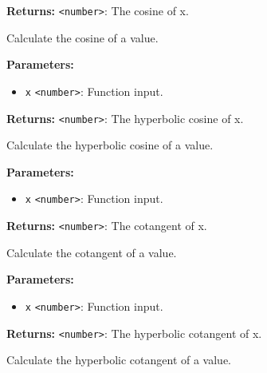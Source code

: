 \documentclass[12pt,a4paper]{article}
\begin{document}
\noindent \textbf{Returns:} \texttt{<number>}: The cosine of x.

\noindent Calculate the cosine of a value.

\vspace{5mm}
\noindent {}


\noindent \textbf{Parameters:}
\begin{itemize}
  \item \texttt{x} \texttt{<number>}: Function input.
\end{itemize}

\noindent \textbf{Returns:} \texttt{<number>}: The hyperbolic cosine of x.

\noindent Calculate the hyperbolic cosine of a value.

\vspace{5mm}
\noindent {}


\noindent \textbf{Parameters:}
\begin{itemize}
  \item \texttt{x} \texttt{<number>}: Function input.
\end{itemize}

\noindent \textbf{Returns:} \texttt{<number>}: The cotangent of x.

\noindent Calculate the cotangent of a value.

\vspace{5mm}
\noindent {}


\noindent \textbf{Parameters:}
\begin{itemize}
  \item \texttt{x} \texttt{<number>}: Function input.
\end{itemize}

\noindent \textbf{Returns:} \texttt{<number>}: The hyperbolic cotangent of x.

\noindent Calculate the hyperbolic cotangent of a value.

\vspace{5mm}
\noindent {}\vspace{4mm}
\end{document}
